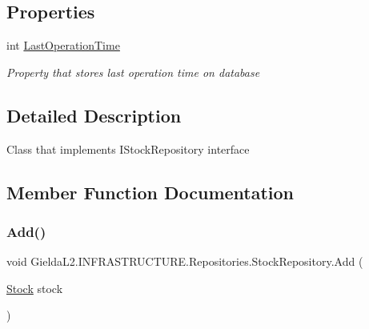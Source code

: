 \subsection*{Properties}
\begin{DoxyCompactItemize}
\item 
int \mbox{\hyperlink{class_gielda_l2_1_1_i_n_f_r_a_s_t_r_u_c_t_u_r_e_1_1_repositories_1_1_stock_repository_ad3ab67441718bfdf224b9302e646f94f}{Last\+Operation\+Time}}
\begin{DoxyCompactList}\small\item\em Property that stores last operation time on database \end{DoxyCompactList}\end{DoxyCompactItemize}


\subsection{Detailed Description}
Class that implements I\+Stock\+Repository interface 



\subsection{Member Function Documentation}
\mbox{\label{class_gielda_l2_1_1_i_n_f_r_a_s_t_r_u_c_t_u_r_e_1_1_repositories_1_1_stock_repository_a156b8b54cd523f36d5a5e82a0d7532ec}} 
\subsubsection{\texorpdfstring{Add()}{Add()}}
{\footnotesize\ttfamily void Gielda\+L2.\+I\+N\+F\+R\+A\+S\+T\+R\+U\+C\+T\+U\+R\+E.\+Repositories.\+Stock\+Repository.\+Add (\begin{DoxyParamCaption}\item[{\mbox{\hyperlink{class_gielda_l2_1_1_d_b_1_1_entities_1_1_stock}{Stock}}}]{stock }\end{DoxyParamCaption})}



